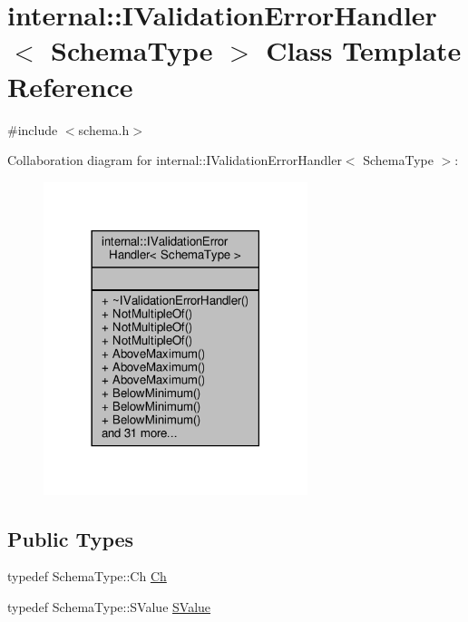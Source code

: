 \hypertarget{classinternal_1_1IValidationErrorHandler}{}\section{internal\+:\+:I\+Validation\+Error\+Handler$<$ Schema\+Type $>$ Class Template Reference}
\label{classinternal_1_1IValidationErrorHandler}


{\ttfamily \#include $<$schema.\+h$>$}



Collaboration diagram for internal\+:\+:I\+Validation\+Error\+Handler$<$ Schema\+Type $>$\+:
\nopagebreak
\begin{figure}[H]
\begin{center}
\leavevmode
\includegraphics[width=218pt]{classinternal_1_1IValidationErrorHandler__coll__graph}
\end{center}
\end{figure}
\subsection*{Public Types}
\begin{DoxyCompactItemize}
\item 
typedef Schema\+Type\+::\+Ch \hyperlink{classinternal_1_1IValidationErrorHandler_a22e6a5f35edb9b614156ad606dcc79d7}{Ch}
\item 
typedef Schema\+Type\+::\+S\+Value \hyperlink{classinternal_1_1IValidationErrorHandler_a22eda6c4ea9537f1ba00d76af052649a}{S\+Value}
\end{DoxyCompactItemize}
